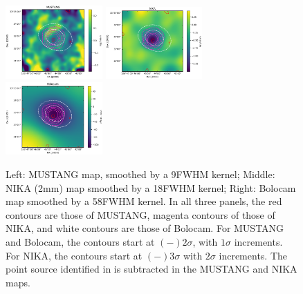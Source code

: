 \documentclass[twocolumn,traditabstract]{aa}
\begin{document}
\begin{figure}[!h]
  \centering
  \includegraphics[width=0.33\textwidth]{NIKA_ml_deproj_figs/MUSTANG_image_and_SNR_contours_cbar.eps}
  \includegraphics[width=0.33\textwidth]{NIKA_ml_deproj_figs/NIKA_image_and_SNR_contours_cbar.eps}
  \includegraphics[width=0.33\textwidth]{NIKA_ml_deproj_figs/BOLOCAM_image_and_SNR_contours_cbar.eps}
  \caption{Left: MUSTANG map, smoothed by a 9\asecs FWHM kernel; Middle: NIKA (2mm) map smoothed by a 18\asecs FWHM kernel;
    Right: Bolocam map smoothed by a 58\asecs FWHM kernel. In all three panels, the red contours are those
    of MUSTANG, magenta contours of those of NIKA, and white contours are those of Bolocam. For MUSTANG and Bolocam, the contours
    start at $(-)2\sigma$, with $1\sigma$ increments. For NIKA, the contours start at $(-)3\sigma$ with $2\sigma$ increments.
    The point source identified in \citet{adam2015} is subtracted in the MUSTANG
    and NIKA maps.}
  \label{fig:clj1227_maps}
\end{figure}




\end{document}
